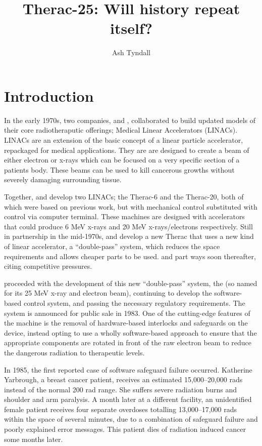 \documentclass{cshonours}
\title{Therac-25: Will history repeat itself?}
\author{Ash Tyndall}
\begin{document}
\maketitle

\tableofcontents
\listoftables
\listoffigures

\chapter{Introduction}

In the early 1970s, two companies, \aecl and \cgr, collaborated to build updated models of their core radiotheraputic offerings; Medical Linear Accelerators (LINACs). LINACs are an extension of the basic concept of a linear particle accelerator, repackaged for medical applications. They are are designed to create a beam of either electron or x-rays which can be focused on a very specific section of a patients body. These beams can be used to kill cancerous growths without severely damaging surrounding tissue.

Together, \aecl and \cgr develop two LINACs; the Therac-6 and the Therac-20, both of which were based on previous \cgr work, but with mechanical control substituted with control via computer terminal. These machines are designed with accelerators that could produce 6 MeV x-rays and 20 MeV x-rays/electrons respectively. Still in partnership in the mid-1970s, \aecl and \cgr develop a new Therac that uses a new kind of linear accelerator, a ``double-pass'' system, which reduces the space requirements and allows cheaper parts to be used. \aecl and \cgr part ways soon thereafter, citing competitive pressures. 

\aecl proceeded with the development of this new ``double-pass'' system, the \ther (so named for its 25 MeV x-ray and electron beam), continuing to develop the software-based control system, and passing the necessary regulatory requirements. The system is announced for public sale in 1983. One of the cutting-edge features of the machine is the removal of hardware-based interlocks and safeguards on the device, \aecl instead opting to use a wholly software-based approach to ensure that the appropriate components are rotated in front of the raw electron beam to reduce the dangerous radiation to therapeutic levels.

In 1985, the first reported case of \ther software safeguard failure occurred. Katherine Yarbrough, a breast cancer patient, receives an estimated 15,000--20,000 rads instead of the normal 200 rad range. She suffers severe radiation burns and shoulder and arm paralysis. A month later at a different facility, an unidentified female patient receives four separate overdoses totalling 13,000--17,000 rads within the space of several minutes, due to a combination of safeguard failure and poorly explained error messages. This patient dies of radiation induced cancer some months later.
\end{document}
